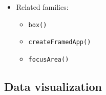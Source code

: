 \begin{itemize}
  \begin{itemize}
  \tightlist
  \item
    rich: keep spatial relationships and resizable or placed regions where they materially help
  \item
    static: retain simplified spatial grouping when possible without fake interactivity
  \item
    pipe: lower to sensible sequential content order
  \item
    accessible: linearize regions in a predictable reading order with section labels
  \end{itemize}
\item
  Related families:

  \begin{itemize}
  \tightlist
  \item
    \texttt{b\allowbreak{}o\allowbreak{}x\allowbreak{}(\allowbreak{})}
  \item
    \texttt{c\allowbreak{}r\allowbreak{}e\allowbreak{}a\allowbreak{}t\allowbreak{}e\allowbreak{}F\allowbreak{}r\allowbreak{}a\allowbreak{}m\allowbreak{}e\allowbreak{}d\allowbreak{}A\allowbreak{}p\allowbreak{}p\allowbreak{}(\allowbreak{})}
  \item
    \texttt{f\allowbreak{}o\allowbreak{}c\allowbreak{}u\allowbreak{}s\allowbreak{}A\allowbreak{}r\allowbreak{}e\allowbreak{}a\allowbreak{}(\allowbreak{})}
  \end{itemize}
\end{itemize}

\subsection{Data visualization}\label{record-019-data-visualization}

